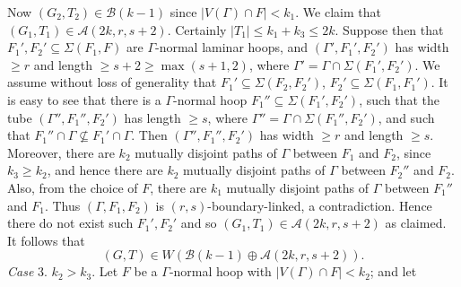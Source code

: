 Now $(G_2, T_2) \in \mathscr{B}(k - 1)$ since $|V(\Gamma) \cap F| < k_1$. We claim that $(G_1, T_1) \in \mathscr{A}(2k, r, s + 2)$. Certainly $|T_1| \le k_1 + k_3 \le 2k$. Suppose then that $F_1', F_2' \subseteq \Sigma(F_1, F)$ are $\Gamma$-normal laminar hoops, and $(\Gamma', F_1', F_2')$ has width $\ge r$ and length $\ge s + 2 \ge \max(s + 1, 2)$, where $\Gamma' = \Gamma \cap \Sigma(F_1', F_2')$. We assume without loss of generality that $F_1' \subseteq \Sigma(F_2, F_2')$, $F_2' \subseteq \Sigma(F_1, F_1')$. It is easy to see that there is a $\Gamma$-normal hoop $F_1'' \subseteq \Sigma(F_1', F_2')$, such that the tube $(\Gamma'', F_1'', F_2')$ has length $\ge s$, where $\Gamma'' = \Gamma \cap \Sigma(F_1'', F_2')$, and such that $F_1'' \cap \Gamma \nsubseteq F_1' \cap \Gamma$. Then $(\Gamma'', F_1'', F_2')$ has width $\ge r$ and length $\ge s$. Moreover, there are $k_2$ mutually disjoint paths of $\Gamma$ between $F_1$ and $F_2$, since $k_3 \ge k_2$, and hence there are $k_2$ mutually disjoint paths of $\Gamma$ between $F_2''$ and $F_2$. Also, from the choice of $F$, there are $k_1$ mutually disjoint paths of $\Gamma$ between $F_1''$ and $F_1$. Thus $(\Gamma, F_1, F_2)$ is $(r, s)$-boundary-linked, a contradiction. Hence there do not exist such $F_1', F_2'$ and so $(G_1, T_1) \in \mathscr{A}(2k, r, s + 2)$ as claimed. It follows that
\begin{equation*}
(G, T) \in W(\mathscr{B}(k - 1) \oplus \mathscr{A}(2k, r, s + 2)).
\end{equation*}
\textit{Case} 3. $k_2 > k_3$. Let $F$ be a $\Gamma$-normal hoop with $|V(\Gamma) \cap F| < k_2$; and let
